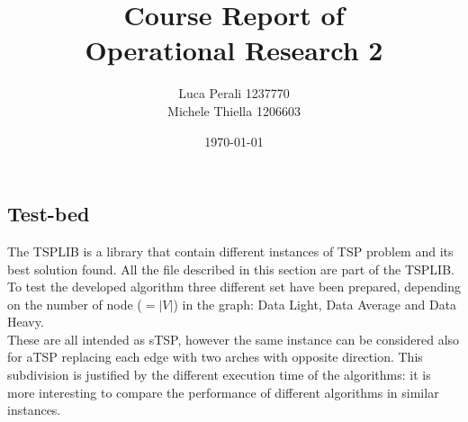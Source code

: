 \documentclass[11pt, english, openany]{report}
\title{Course Report of \\ Operational Research 2}
\author{Luca Perali 1237770 \\ Michele Thiella 1206603}
\date{\today}
\begin{document}

	
	

	\tableofcontents{}
	\clearpage

	
	
	
	
	
	
	
	
	\clearpage
	
	\begin{appendices}
		\chapter{Test-bed} \label{sec:testset}
		The TSPLIB \cite{TSPLIB} is a library that contain different instances of TSP problem and its best solution found. All the file described in this section are part of the TSPLIB. To test the developed algorithm three different set have been prepared, depending on the number of node ($=|V|$) in the graph: Data Light, Data Average and Data Heavy.\\
		These are all intended as sTSP, however the same instance can be considered also for aTSP replacing each edge with two arches with opposite direction. This subdivision is justified by the different execution time of the algorithms: it is more interesting to compare the performance of different algorithms in similar instances.\\
		

\end{appendices}
\end{document}
